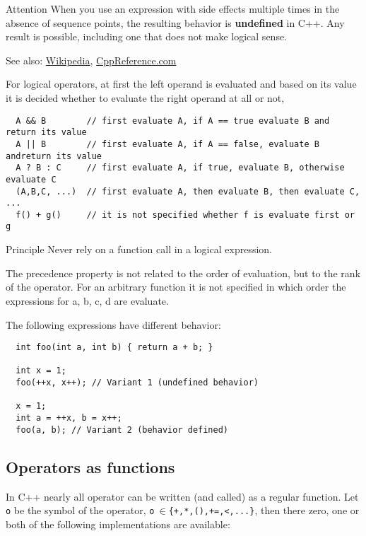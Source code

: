 {\begin{guideline}{Attention}
  When you use an expression with side effects multiple times in the absence of sequence points, the resulting behavior is \textbf{undefined} in C++.
  Any result is possible, including one that does not make logical sense.
\end{guideline}

See also: \href{http://en.wikipedia.org/wiki/Sequence_point}{Wikipedia}, \href{http://en.cppreference.com/w/cpp/language/eval_order}{CppReference.com}

For logical operators, at first the left operand is evaluated and based on its value it is decided whether to evaluate the right operand
at all or not, \ie
\begin{verbatim}
  A && B        // first evaluate A, if A == true evaluate B and return its value
  A || B        // first evaluate A, if A == false, evaluate B andreturn its value
  A ? B : C     // first evaluate A, if true, evaluate B, otherwise evaluate C
  (A,B,C, ...)  // first evaluate A, then evaluate B, then evaluate C, ...
  f() + g()     // it is not specified whether f is evaluate first or g
\end{verbatim}

\begin{guideline}{Principle}
  Never rely on a function call in a logical expression.
\end{guideline}

\begin{rem}
  The precedence property is not related to the order of evaluation, but to the rank of the operator. For an arbitrary function  it
  is not specified in which order the expressions for a, b, c, d are evaluate.
\end{rem}

\begin{example}
  The following expressions have different behavior:
  \begin{verbatim}
  int foo(int a, int b) { return a + b; }

  int x = 1;
  foo(++x, x++); // Variant 1 (undefined behavior)

  x = 1;
  int a = ++x, b = x++;
  foo(a, b); // Variant 2 (behavior defined)
  \end{verbatim}
\end{example}


\subsection{Operators as functions}
In C++ nearly all operator can be written (and called) as a regular function. Let \texttt{o} be the symbol of the operator, \eg
\texttt{o$~\in$\{+,*,(),+=,<,...\}}, then there zero, one or both of the following implementations are available:

}
